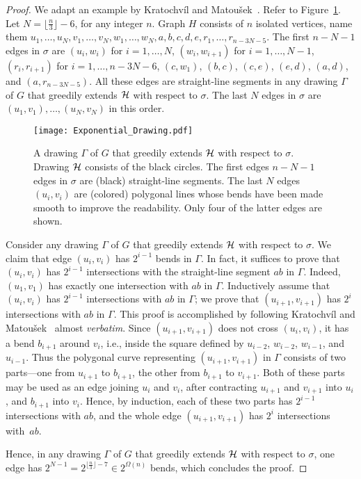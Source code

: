 \documentclass{llncs}
\begin{document}
\begin{proof}
We adapt an example by Kratochv\' il and Matou\v sek~\cite{km-sgrer-91}. Refer to Figure~\ref{fig:exponential}. Let $N=\lfloor \frac{n}{3} \rfloor -6$, for any integer $n$. Graph $H$ consists of $n$ isolated vertices, name them $u_1,\dots,u_N, v_1,\dots,v_N,w_1,\dots,w_N,a,b,c,d,e,r_1,\dots,r_{n-3N-5}$. The first $n-N-1$ edges in $\sigma$ are $(u_i,w_i)$ for $i=1,\dots,N$, $(w_i,w_{i+1})$ for $i=1,\dots,N-1$, $(r_i,r_{i+1})$ for $i=1,\dots,n-3N-6$, $(c,w_1)$, $(b,c)$, $(c,e)$, $(e,d)$, $(a,d)$, and $(a,r_{n-3N-5})$. All these edges are straight-line segments in any drawing $\Gamma$ of $G$ that greedily extends $\cal H$ with respect to $\sigma$. The last $N$ edges in $\sigma$ are $(u_1,v_1),\dots,(u_N,v_N)$ in this order.

\begin{figure}[tb]
\centering
\texttt{[image: Exponential\_Drawing.pdf]}
\caption{A drawing $\Gamma$ of $G$ that greedily extends $\cal H$ with respect to $\sigma$. Drawing $\cal H$ consists of the black circles. The first edges $n-N-1$ edges in $\sigma$ are (black) straight-line segments. The last $N$ edges $(u_i,v_i)$ are (colored) polygonal lines whose bends have been made smooth to improve the readability. Only four of the latter edges are shown.}
\label{fig:exponential}
\end{figure}

Consider any drawing $\Gamma$ of $G$ that greedily extends $\cal H$ with respect to $\sigma$. We claim that edge $(u_i,v_i)$ has $2^{i-1}$ bends in $\Gamma$. In fact, it suffices to prove that $(u_i,v_i)$ has $2^{i-1}$ intersections with the straight-line segment $ab$ in $\Gamma$. Indeed, $(u_1,v_1)$ has exactly one intersection with $ab$ in $\Gamma$. Inductively assume that $(u_{i},v_{i})$ has $2^{i-1}$ intersections with $ab$ in $\Gamma$; we prove that $(u_{i+1},v_{i+1})$ has $2^{i}$ intersections with $ab$ in $\Gamma$. This proof is accomplished by following Kratochv\' il and Matou\v sek~\cite{km-sgrer-91} almost {\em verbatim}. Since $(u_{i+1},v_{i+1})$ does not cross $(u_{i},v_{i})$, it has a bend $b_{i+1}$ around $v_i$, i.e., inside the square defined by $u_{i-2}$, $w_{i-2}$, $w_{i-1}$, and $u_{i-1}$. Thus the polygonal curve representing $(u_{i+1},v_{i+1})$ in $\Gamma$ consists of two parts---one from $u_{i+1}$ to $b_{i+1}$, the other from $b_{i+1}$ to $v_{i+1}$. Both of these parts may be used as an edge joining $u_i$ and $v_i$, after contracting $u_{i+1}$ and $v_{i+1}$ into $u_i$, and $b_{i+1}$ into $v_i$. Hence, by induction, each of these two parts has $2^{i-1}$ intersections with $ab$, and the whole edge $(u_{i+1},v_{i+1})$ has $2^{i}$ intersections with~$ab$.

Hence, in any drawing $\Gamma$ of $G$ that greedily extends $\cal H$ with respect to $\sigma$, one edge has $2^{N-1}=2^{\lfloor \frac{n}{3} \rfloor -7}\in 2^{\Omega(n)}$ bends, which concludes the proof.
\end{proof}
\end{document}

